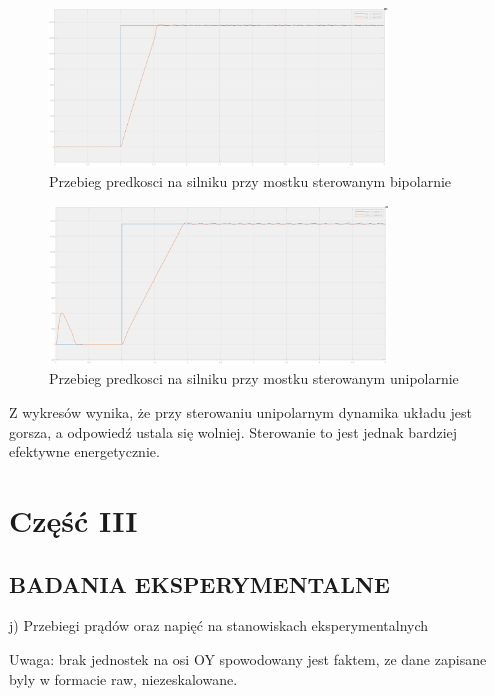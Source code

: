 \documentclass[11pt]{article}
\begin{document}
\begin{figure}[H]
\centering
\includegraphics[width=0.8\textwidth]{aun1_bipolar_bridge2.png}
\caption{Przebieg predkosci na silniku przy mostku sterowanym bipolarnie}
\end{figure}

\begin{figure}[H]
\centering
\includegraphics[width=0.8\textwidth]{aun1_unipolar_bridge2.png}
\caption{Przebieg predkosci na silniku przy mostku sterowanym unipolarnie}
\end{figure}

Z wykresów wynika, że przy sterowaniu unipolarnym dynamika układu jest gorsza, a odpowiedź ustala się wolniej. Sterowanie to jest jednak bardziej efektywne energetycznie.\\

\section{Część III}

\subsection{BADANIA EKSPERYMENTALNE}

j) Przebiegi prądów oraz napięć na stanowiskach eksperymentalnych

Uwaga: brak jednostek na osi OY spowodowany jest faktem, ze dane
zapisane byly w formacie raw, niezeskalowane.\\
\end{document}
